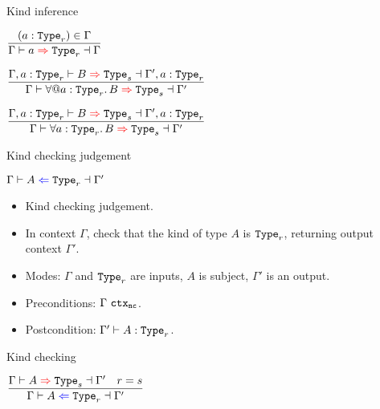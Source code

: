 \begin{frame}{Kind inference}

\begin{center}
  $\infrule{(a : \Type[r]) \in \Gamma}{\inferkind{\Gamma}{a}[r]{\Gamma}}$

  \vspace{2em}

  $\infrule{\inferkind{\extendtype{\Gamma}{a}[r]}{B}[s]{\extendtype{\Gamma'}{a}[r]}}{\inferkind{\Gamma}{\ForallE{a}[r]{B}}[s]{\Gamma'}}$

  \vspace{2em}

  $\infrule{\inferkind{\extendtype{\Gamma}{a}[r]}{B}[s]{\extendtype{\Gamma'}{a}[r]}}{\inferkind{\Gamma}{\ForallI{a}[r]{B}}[s]{\Gamma'}}$
\end{center}

\end{frame}

\begin{frame}{Kind checking judgement}

$\checkkind{\Gamma}{A}[r]{\Gamma'}$
\begin{itemize}
  \item Kind checking judgement.
  \item In context $\Gamma$, check that the kind of type $A$ is $\Type[r]$, returning output context $\Gamma'$.
  \item Modes: $\Gamma$ and $\Type[r]$ are inputs, $A$ is subject, $\Gamma'$ is an output.
  \item Preconditions: $\ctx[\noncomputable]{\Gamma}$.
  \item Postcondition: $\type[\Gamma']{A}[r]$.
\end{itemize}

\end{frame}

\begin{frame}{Kind checking}

\begin{center}
  $\infrule{\inferkind{\Gamma}{A}[s]{\Gamma'} \quad r = s}{\checkkind{\Gamma}{A}[r]{\Gamma'}}$
\end{center}

\end{frame}

